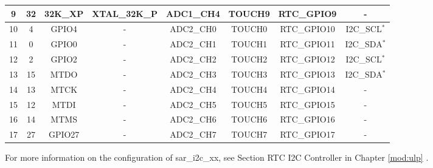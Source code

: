 \begin{small}
\begin{longtable}[c]{|c|c|c|c|c|c|c|c| }
 \hline
  9 & 32 & 32K\_XP      & XTAL\_32K\_P & ADC1\_CH4    & TOUCH9  & RTC\_GPIO9 & -     \\
 \hline
 10 &  4 & GPIO4        & -            & ADC2\_CH0    & TOUCH0  & RTC\_GPIO10 & I2C\_SCL$^*$     \\
 \hline
 11 &  0 & GPIO0        & -            & ADC2\_CH1    & TOUCH1   & RTC\_GPIO11 & I2C\_SDA$^*$   \\
 \hline
 12 &  2 & GPIO2        & -            & ADC2\_CH2    & TOUCH2  & RTC\_GPIO12 & I2C\_SCL$^*$     \\
 \hline
 13 & 15 & MTDO         & -            & ADC2\_CH3    & TOUCH3  & RTC\_GPIO13 & I2C\_SDA$^*$    \\
 \hline
 14 & 13 & MTCK         & -            & ADC2\_CH4    & TOUCH4  & RTC\_GPIO14 & -    \\
 \hline
 15 & 12 & MTDI         & -            & ADC2\_CH5    & TOUCH5  & RTC\_GPIO15 & -     \\
 \hline
 16 & 14 & MTMS         & -            & ADC2\_CH6    & TOUCH6   & RTC\_GPIO16 & -    \\
 \hline
 17 & 27 & GPIO27       & -            & ADC2\_CH7    & TOUCH7    & RTC\_GPIO17 & -  \\
 \hline
 \end{longtable}
 \end{small}
 \begin{tiplisting}
 For more information on the configuration of sar\_i2c\_xx, see Section RTC I2C Controller in Chapter \ref{mod:ulp} \textit{}.
 \end{tiplisting}
